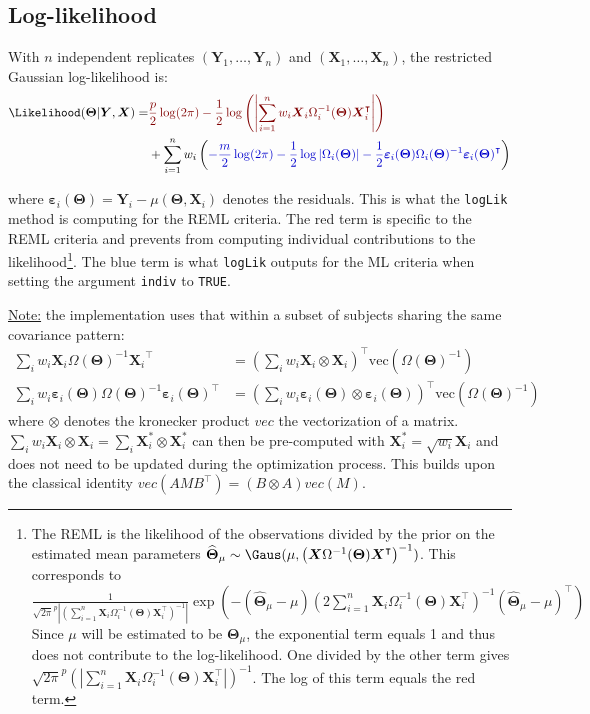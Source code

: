 \documentclass[12pt]{article}
\newcommand{\darkblue}{blue!80!black}
\newcommand{\darkred}{red!50!black}
\newcommand\trans[1]{{#1}^\intercal}%
\newcommand{\param}{\Theta}
\newcommand{\paramHat}{\widehat{\param}}
\newcommand{\Vparam}{\boldsymbol{\param}}
\newcommand{\VparamHat}{\boldsymbol{\paramHat}}
\newcommand{\VX}{\boldsymbol{X}}
\newcommand{\VY}{\boldsymbol{Y}}
\newcommand{\Vvarepsilon}{\boldsymbol{\varepsilon}}
\begin{document}
\subsection{Log-likelihood}
\label{SM:likelihood:log}
With \(n\) independent replicates \(\left(\VY_1,\ldots,\VY_n\right)\) and
\(\left(\VX_1,\ldots,\VX_n\right)\), the restricted Gaussian log-likelihood is:
\begin{align}
\Likelihood(\Vparam|\VY,\VX) =& \textcolor{\darkred}{ \frac{p}{2} \log(2\pi)-\frac{1}{2} \log\left(\left|\sum_{i=1}^n w_i \VX_i \Omega_i^{-1}(\Vparam) \trans{\VX}_i\right|\right)} \notag \\
& + \sum_{i=1}^{n} w_i \left(\textcolor{\darkblue}{-\frac{m}{2} \log(2\pi) - \frac{1}{2} \log\left|\Omega_i(\Vparam)\right| - \frac{1}{2} \Vvarepsilon_i(\Vparam) \Omega_i(\Vparam)^{-1} \trans{\Vvarepsilon_i(\Vparam)}} \right)  \label{eq:log-likelihood}
\end{align}

where \(\Vvarepsilon_i(\Vparam) = \VY_i-\mu(\Vparam,\VX_i)\) denotes
 the residuals. This is what the \texttt{logLik} method is computing for the
 REML criteria. The red term is specific to the REML criteria and
 prevents from computing individual contributions to the
 likelihood\footnote{The REML is the likelihood of the observations divided
 by the prior on the estimated mean parameters \(\VparamHat_{\mu} \sim
 \Gaus(\mu,\left(\VX \Omega^{-1}(\Vparam)
 \trans{\VX}\right)^{-1})\). This corresponds to
 \(\frac{1}{\sqrt{2\pi}^p \left|\left(\sum_{i=1}^n \VX_i
 \Omega_i^{-1}(\Vparam) \trans{\VX}_i\right)^{-1}\right|}
 \exp\left(-(\VparamHat_{\mu}-\mu)\left(2\sum_{i=1}^n \VX_i
 \Omega_i^{-1}(\Vparam)
 \trans{\VX}_i\right)^{-1}\trans{(\VparamHat_{\mu}-\mu)}\right)\)
 Since \(\mu\) will be estimated to be \(\Vparam_{\mu}\), the
 exponential term equals 1 and thus does not contribute to the
 log-likelihood. One divided by the other term gives \(\sqrt{2\pi}^p
 \left(\left|\sum_{i=1}^n \VX_i \Omega_i^{-1}(\Vparam)
 \trans{\VX}_i\right|\right)^{-1}\). The log of this term equals the
 red term.}. The blue term is what \texttt{logLik} outputs for the ML criteria
 when setting the argument \texttt{indiv} to \texttt{TRUE}.

\bigskip

\uline{Note:} the implementation uses that within a subset of subjects
sharing the same covariance pattern:
\begin{align*}
\sum_{i} w_i \VX_i \Omega(\Vparam)^{-1} \trans{\VX_i}
&= \trans{\left(\sum_{i} w_i \VX_i \otimes \VX_i\right)} \text{vec}\left(\Omega(\Vparam)^{-1}\right) \\
\sum_{i} w_i \Vvarepsilon_i(\Vparam) \Omega(\Vparam)^{-1} \trans{\Vvarepsilon_i(\Vparam)}
&= \trans{\left(\sum_{i} w_i \Vvarepsilon_i(\Vparam) \otimes \Vvarepsilon_i(\Vparam)\right)} \text{vec}\left(\Omega(\Vparam)^{-1}\right) 
\end{align*}
where \(\otimes\) denotes the kronecker product \(vec\) the
vectorization of a matrix. \(\sum_{i} w_i \VX_i \otimes \VX_i =
\sum_{i} \VX^*_i \otimes \VX^*_i\) can then be pre-computed with
\(\VX^*_i=\sqrt{w_i}\VX_i\) and does not need to be updated during the
optimization process. This builds upon the classical identity \(vec(AM\trans{B})=
(B \otimes A)vec(M)\).
\end{document}
